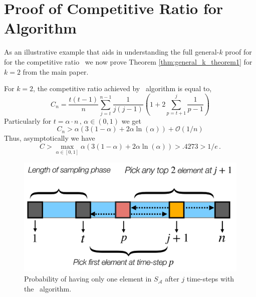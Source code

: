 \appendix
\onecolumn
\section{Proof of Competitive Ratio for \algoname Algorithm}
\label{appendix:virtual_plus_proof_k_2}

As an illustrative example that aids in understanding the full general-$k$ proof for for the competitive ratio \algoname\ we now prove Theorem \ref{thm:general_k_theorem1} for $k=2$ from the main paper. 

\begin{theorem}  For $k=2$, the competitive ratio achieved by \algoname\ algorithm is equal to,
\begin{equation}
    C_n = \frac{t(t-1)}{n} \sum_{j=t}^{n-1}\frac{1}{j(j-1)} \left(1 + 2 \sum_{ p=t+1}^j \frac{1}{p-1}\right)
\end{equation}
Particularly for $t= \alpha \cdot n\,,\, \alpha \in (0,1)$ we get 
\begin{equation} \label{eq:lower_bound_alpha1}
    C_n > \alpha ( 3(1-\alpha) + 2 \alpha \ln(\alpha)) + \mathcal{O}(1/n)
\end{equation}
Thus, asymptotically  we have
\begin{equation}
    C >  \max_{\alpha \in [0,1]} \alpha ( 3(1-\alpha) + 2 \alpha \ln(\alpha)) > .4273 > 1/e \, .
\end{equation}
\end{theorem}

\begin{figure}[ht]
    \centering
    \includegraphics[width=1.0\linewidth]{Figures/virtual_plus_k_2.pdf}
    \caption{Probability of having only one element in $S_{\mathcal{A}}$ after $j$ time-steps with the \algoname\ algorithm.}
    \label{fig:k_2}
    \vspace{-15pt}
\end{figure}

